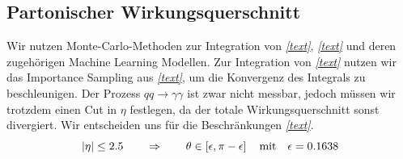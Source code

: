 \subsection{Partonischer Wirkungsquerschnitt}
Wir nutzen Monte-Carlo-Methoden zur Integration von \textit{\autoref{text}}, \textit{\autoref{text}} und deren zugehörigen Machine Learning Modellen. Zur Integration von \textit{\autoref{text}} nutzen wir das Importance Sampling aus \textit{\autoref{text}}, um die Konvergenz des Integrals zu beschleunigen. Der Prozess $qq \rightarrow \gamma \gamma$ ist zwar nicht messbar, jedoch müssen wir trotzdem einen Cut in $\eta$ festlegen, da der totale Wirkungsquerschnitt sonst divergiert. Wir entscheiden uns für die Beschränkungen \textit{\autoref{text}}.
\begin{equation}
	\abs{\eta} \leq 2.5 \qquad \Rightarrow \qquad \theta \in \left[\epsilon, \pi - \epsilon \right] \quad \text{mit} \quad \epsilon = 0.1638
\end{equation}
